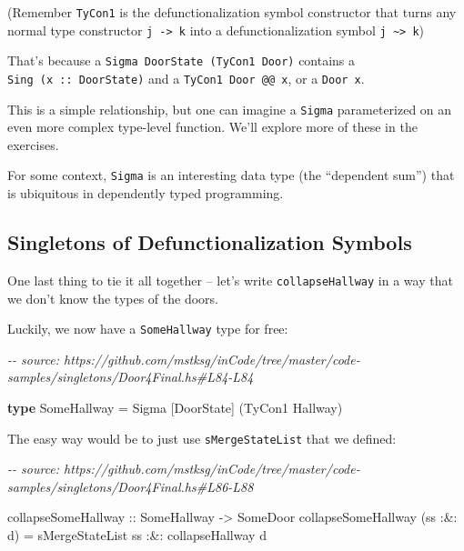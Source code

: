 \documentclass[]{article}
\newenvironment{Shaded}{}{}
\newcommand{\CommentTok}[1]{\textcolor[rgb]{0.38,0.63,0.69}{\textit{#1}}}
\newcommand{\DataTypeTok}[1]{\textcolor[rgb]{0.56,0.13,0.00}{#1}}
\newcommand{\KeywordTok}[1]{\textcolor[rgb]{0.00,0.44,0.13}{\textbf{#1}}}
\newcommand{\NormalTok}[1]{#1}
\newcommand{\OperatorTok}[1]{\textcolor[rgb]{0.40,0.40,0.40}{#1}}
\newcommand{\OtherTok}[1]{\textcolor[rgb]{0.00,0.44,0.13}{#1}}
\begin{document}
(Remember \texttt{TyCon1} is the defunctionalization symbol constructor that
turns any normal type constructor \texttt{j\ -\textgreater{}\ k} into a
defunctionalization symbol \texttt{j\ \textasciitilde{}\textgreater{}\ k})

That's because a \texttt{Sigma\ DoorState\ (TyCon1\ Door)} contains a
\texttt{Sing\ (x\ ::\ DoorState)} and a \texttt{TyCon1\ Door\ @@\ x}, or a
\texttt{Door\ x}.

This is a simple relationship, but one can imagine a \texttt{Sigma}
parameterized on an even more complex type-level function. We'll explore more of
these in the exercises.

For some context, \texttt{Sigma} is an interesting data type (the ``dependent
sum'') that is ubiquitous in dependently typed programming.

\hypertarget{singletons-of-defunctionalization-symbols}{%
\subsection{Singletons of Defunctionalization
Symbols}\label{singletons-of-defunctionalization-symbols}}

One last thing to tie it all together -- let's write \texttt{collapseHallway} in
a way that we don't know the types of the doors.

Luckily, we now have a \texttt{SomeHallway} type for free:

\begin{Shaded}
\begin{Highlighting}[]
\CommentTok{{-}{-} source: https://github.com/mstksg/inCode/tree/master/code{-}samples/singletons/Door4Final.hs\#L84{-}L84}

\KeywordTok{type} \DataTypeTok{SomeHallway} \OtherTok{=} \DataTypeTok{Sigma}\NormalTok{ [}\DataTypeTok{DoorState}\NormalTok{] (}\DataTypeTok{TyCon1} \DataTypeTok{Hallway}\NormalTok{)}
\end{Highlighting}
\end{Shaded}

The easy way would be to just use \texttt{sMergeStateList} that we defined:

\begin{Shaded}
\begin{Highlighting}[]
\CommentTok{{-}{-} source: https://github.com/mstksg/inCode/tree/master/code{-}samples/singletons/Door4Final.hs\#L86{-}L88}

\OtherTok{collapseSomeHallway ::} \DataTypeTok{SomeHallway} \OtherTok{{-}>} \DataTypeTok{SomeDoor}
\NormalTok{collapseSomeHallway (ss }\OperatorTok{:\&:}\NormalTok{ d) }\OtherTok{=}\NormalTok{ sMergeStateList ss}
                             \OperatorTok{:\&:}\NormalTok{ collapseHallway d}
\end{Highlighting}
\end{Shaded}
\end{document}
